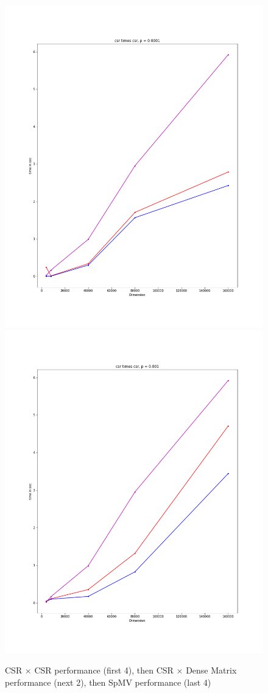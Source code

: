 \documentclass[12pt]{article}
\begin{document}
\begin{figure}[h]
  \caption{CSR $\times$ CSR performance (first 4), then CSR $\times$ Dense Matrix performance (next 2), then SpMV performance (last 4) }
  \includegraphics[scale = 0.16]{csr_csr_0001.PNG}
  \includegraphics[scale = 0.16]{csr_csr_001.PNG}

\end{figure}
\end{document}
